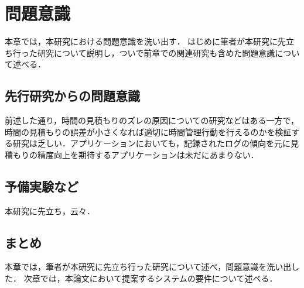 \chapter{問題意識}
本章では，本研究における問題意識を洗い出す．
はじめに筆者が本研究に先立ち行った研究について説明し，ついで前章での関連研究も含めた問題意識について述べる．

\section{先行研究からの問題意識}
前述した通り，時間の見積もりのズレの原因についての研究などはある一方で，時間の見積もりの誤差が小さくなれば適切に時間管理行動を行えるのかを検証する研究は乏しい．アプリケーションにおいても，記録されたログの傾向を元に見積もりの精度向上を期待するアプリケーションは未だにあまりない．

\section{予備実験など}
本研究に先立ち，云々．

\section{まとめ}
本章では，筆者が本研究に先立ち行った研究について述べ，問題意識を洗い出した．
次章では，本論文において提案するシステムの要件について述べる．